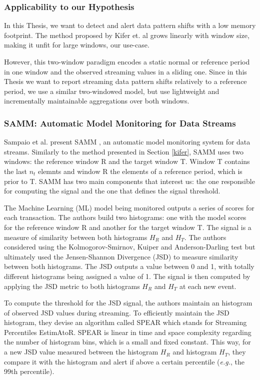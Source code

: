 \subsubsection*{Applicability to our Hypothesis}
In this Thesis, we want to detect and alert data pattern shifts with a low memory footprint. The method proposed by Kifer et. al grows linearly with window size, making it unfit for large windows, our use-case.

However, this two-window paradigm encodes a static normal or reference period in one window and the observed streaming values in a sliding one. Since in this Thesis we want to report streaming data pattern shifts relatively to a reference period, we use a similar two-windowed model, but use lightweight and incrementally maintainable aggregations over both windows.


\subsubsection{SAMM: Automatic Model Monitoring for Data Streams}

Sampaio et al. present SAMM \cite{SAMM}, an automatic model monitoring system for data streams. Similarly to the method presented in Section \ref{kifer}, SAMM uses two windows: the reference window R and the target window T. Window T contains the last $n_t$ elemnts and window R the elements of a reference period, which is prior to T. SAMM has two main components that interest us: the one responsible for computing the signal and the one that defines the signal threshold. 

The Machine Learning (ML) model being monitored outputs a series of scores for each transaction. The authors build two histograms: one with the model scores for the reference window R and another for the target window T. The signal is a measure of similarity between both histograms $H_R$ and $H_T$. The authors considered using the Kolmogorov-Smirnov, Kuiper and Anderson-Darling test but ultimately used the Jensen-Shannon Divergence (JSD) \cite{JSD} to measure similarity between both histograms. The JSD outputs a value between 0 and 1, with totally different histograms being assigned a value of 1. The signal is then computed by applying the JSD metric to both histograms $H_R$ and $H_T$ at each new event.

To compute the threshold for the JSD signal, the authors maintain an histogram of observed JSD values during streaming. To efficiently maintain the JSD histogram, they devise an algorithm called SPEAR which stands for Streaming Percentiles EstimAtoR. SPEAR is linear in time and space complexity regarding the number of histogram bins, which is a small and fixed constant. This way, for a new JSD value measured between the histogram $H_R$ and histogram $H_T$, they compare it with the histogram and alert if above a certain percentile (\textit{e.g.}, the 99th percentile).

